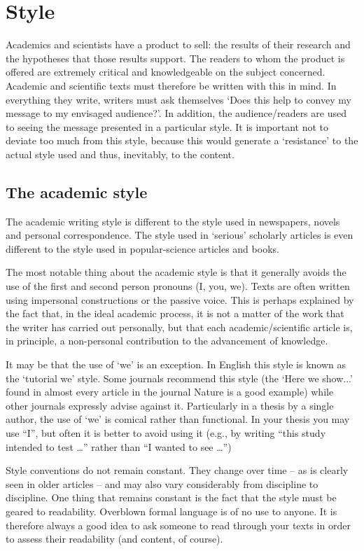 \section{Style}\label{sec:style}
Academics and scientists have a product to sell: the results of their research and the hypotheses that those results support. The readers to whom the product is offered are extremely critical and knowledgeable on the subject concerned. Academic and scientific texts must therefore be written with this in mind. In everything they write, writers must ask themselves `Does this help to convey my message to my envisaged audience?'. In addition, the audience/readers are used to seeing the message presented in a particular style. It is important not to deviate too much from this style, because this would generate a `resistance' to the actual style used and thus, inevitably, to the content.

\subsection{The academic style}\label{sec:_academic_style}
The academic writing style is different to the style used in newspapers, novels and personal correspondence. The style used in `serious' scholarly articles is even different to the style used in popular-science articles and books.

The most notable thing about the academic style is that it generally avoids the use of the first and second person pronouns (I, you, we). Texts are often written using impersonal constructions or the passive voice. This is perhaps explained by the fact that, in the ideal academic process, it is not a matter of the work that the writer has carried out personally, but that each academic/scientific article is, in principle, a non-personal contribution to the advancement of knowledge.

It may be that the use of `we' is an exception. In English this style is known as the `tutorial we' style. Some journals recommend this style (the `Here we show...' found in almost every article in the journal Nature is a good example) while other journals expressly advise against it. Particularly in a thesis by a single author, the use of `we' is comical rather than functional. In your thesis you may use ``I'', but often it is better to avoid using it (e.g., by writing ``this study intended to test …'' rather than ``I wanted to see …'')

Style conventions do not remain constant. They change over time – as is clearly seen in older articles – and may also vary considerably from discipline to discipline. One thing that remains constant is the fact that the style must be geared to readability. Overblown formal language is of no use to anyone. It is therefore always a good idea to ask someone to read through your texts in order to assess their readability (and content, of course).

